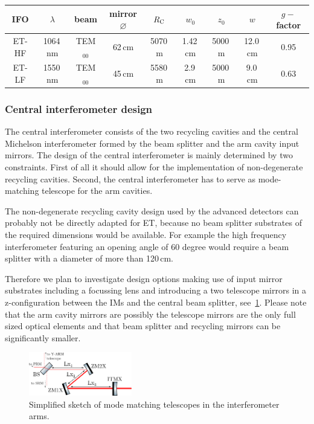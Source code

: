 \begin{center}
\begin{tabular}{|c|c|c|c|c|c|c|c|c|}
  \hline
IFO & $\lambda$& beam & mirror $\varnothing$ & $R_{\rm C}$ & $w_0$ &$z_0$ & $w$ & $g-$factor \\
\hline
ET-HF & 1064\,nm & TEM$_{00}$ & 62\,cm & 5070\,m & 1.42\,cm & 5000\,m & 12.0\,cm & 0.95\\
\hline
ET-LF & 1550\,nm & TEM$_{00}$ & 45\,cm &5580\,m & 2.9\,cm & 5000\,m & 9.0\,cm & 0.63\\
\hline
\end{tabular}
\end{center}


\FloatBarrier
\subsubsection{Central interferometer design}
\label{sec:opt_layout_CITF}

The central interferometer consists of the two recycling cavities and the
central Michelson interferometer formed by the beam splitter and the arm cavity
input mirrors. The design of the central interferometer is mainly determined by
two constraints. First of all it should allow for the implementation of
non-degenerate recycling cavities. Second, the central interferometer has to
serve as mode-matching telescope for the arm cavities.

The non-degenerate recycling cavity design used by the advanced detectors 
can probably not be directly
adapted for ET, because no beam splitter substrates of the required dimensions
would be available. For example the high frequency interferometer featuring an
opening angle of 60 degree would require a beam splitter with a diameter of
more than 120\,cm.

Therefore we plan to investigate design options making use of input mirror
substrates including a focussing lens and introducing a two telescope 
mirrors in a z-configuration between the IMs and the central beam
splitter, see~\ref{Fig:mode_matching_telescope}.
Please note that the arm cavity mirrors are possibly the telescope mirrors are
the only full sized optical elements and that beam splitter and recycling
mirrors  can be significantly smaller.

\begin{figure}[thbp]
\centering
\includegraphics[width=0.4\textwidth]{Detector/Optics/OpticalLayout/OpticalLayoutFigures/telescope_drawing.pdf}
\caption{Simplified sketch of mode matching telescopes in the interferometer
arms.
}
\label{Fig:mode_matching_telescope}
\end{figure}

